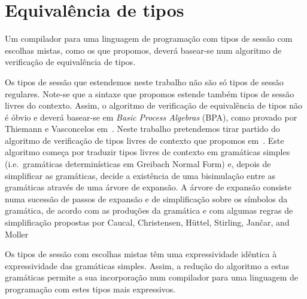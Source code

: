 \section{Equivalência de tipos}

Um compilador para uma linguagem de programação com
tipos de sessão com escolhas mistas,
como os que propomos, deverá basear-se num algoritmo de 
verificação de equivalência de tipos. 

Os tipos de sessão que estendemos
neste trabalho não são só tipos de sessão regulares.
Note-se que a sintaxe que propomos estende também
tipos de sessão livres do contexto.
Assim, o algoritmo de verificação de equivalência de tipos 
não é óbvio e deverá basear-se em \emph{Basic Process Algebras}
(BPA), como provado por Thiemann e Vasconcelos em~\cite{ref-cfst}.
Neste trabalho pretendemos tirar partido do algoritmo de verificação
de tipos livres de contexto que propomos em~\cite{type-equiv}.
Este algoritmo começa por traduzir tipos livres de contexto
em gramáticas simples (i.e.\ gramáticas determinísticas
em Greibach Normal Form) e, depois de simplificar as 
gramáticas, decide a existência de uma bisimulação entre as gramáticas
através de uma árvore de expansão. 
A árvore de expansão consiste numa
sucessão de passos de expansão e de simplificação 
sobre os símbolos da gramática, de acordo com 
as produções da gramática e com algumas regras de simplificação
propostas por Caucal, Christensen,
H\"uttel, Stirling, Jan\v car, and Moller
~\cite{caucal1986decidabilite,
  DBLP:journals/iandc/ChristensenHS95,janvcar1999techniques}

Os tipos de sessão com escolhas mistas têm
uma expressividade idêntica à expressividade das gramáticas
simples. Assim, a redução do algoritmo a estas gramáticas
permite a sua incorporação num compilador
para uma linguagem de programação com estes tipos mais expressivos.

